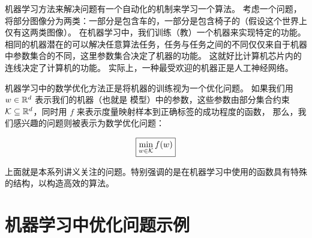 机器学习方法来解决问题有一个自动化的机制来学习一个算法。
考虑一个问题，将部分图像分为两类：一部分是包含车的，一部分是包含椅子的（假设这个世界上仅有这两类图像）。
在机器学习中，我们训练（教）一个机器来实现特定的功能。
相同的机器潜在的可以解决任意算法任务，任务与任务之间的不同仅仅来自于机器中参数集合的不同，这里参数集合决定了机器的功能。
这就好比计算机芯片内的连线决定了计算机的功能。
实际上，一种最受欢迎的机器正是人工神经网络。

机器学习中的数学优化方法正是将机器的训练视为一个优化问题。
如果我们用 $w \in {\mathbb R}^d$ 表示我们的机器（也就是 模型）中的参数，这些参数由部分集合约束 $\mathcal K \subseteq {\mathbb R}^d$，同时用 $f$ 来表示度量映射样本到正确标签的成功程度的函数，
那么，我们感兴趣的问题则被表示为数学优化问题：

\begin{equation} \label{eqn:MP}
 \boxed{ \min_{w \in \mathcal K  } f (w)  }
\end{equation}

上面就是本系列讲义关注的问题。特别强调的是在机器学习中使用的函数具有特殊的结构，以构造高效的算法。


\section{
    机器学习中优化问题示例
    }


